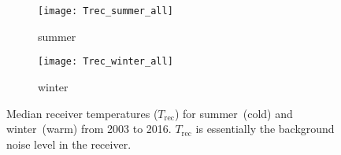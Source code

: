 \begin{figure}[ht]
    \centering
    \begin{subfigure}[b]{0.9545\textwidth}
        \texttt{[image: Trec\_summer\_all]}
        \caption{summer}\label{fig:01:trec:summer}
    \end{subfigure}
    \begin{subfigure}[b]{0.9545\textwidth}
        \texttt{[image: Trec\_winter\_all]}
        \caption{winter}\label{fig:01:trec:winter}
    \end{subfigure}
    \caption{Median receiver temperatures ($T_\mathrm{rec}$) for
        summer~(cold) and winter~(warm) from 2003 to 2016.  $T_\mathrm{rec}$ is
        essentially the background noise level in the receiver.
        }\label{fig:01:trec}
\end{figure}
